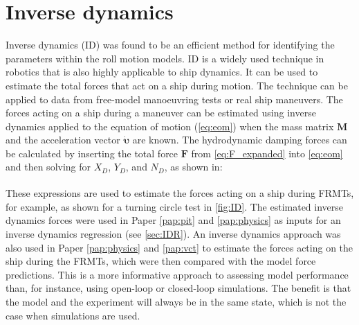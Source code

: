 \section{Inverse dynamics} \label{sec:ID}
Inverse dynamics (ID) was found to be an efficient method for identifying the parameters within the roll motion models. ID is a widely used technique in robotics \cite{faberInverseDynamicsMechanical2018, haningerNonparametricInverseDynamic2019, mastalliInverseDynamicsMPCNullspace2023, sunHighorderInverseDynamics2023, kurtzInverseDynamicsTrajectory2023} that is also highly applicable to ship dynamics. It can be used to estimate the total forces that act on a ship during motion. The technique can be applied to data from free-model manoeuvring tests or real ship maneuvers. The forces acting on a ship during a maneuver can be estimated using inverse dynamics applied to the equation of motion (\autoref{eq:eom}) when the mass matrix $\mathbf{M}$ and the acceleration vector $\pmb{\dot{\upsilon}}$ are known. The hydrodynamic damping forces can be calculated by inserting the total force $\mathbf{F}$ from \autoref{eq:F_expanded} into \autoref{eq:eom} and then solving for $X_D$, $Y_D$, and $N_D$, as shown in:
\begin{equation}
\label{eq:ID}
\begin{aligned}
    &  & \\
    &  & \\
    &  & 
\end{aligned}
\end{equation}
These expressions are used to estimate the forces acting on a ship during FRMTs, for example, as shown for a turning circle test in \autoref{fig:ID}.
The estimated inverse dynamics forces were used in Paper \ref{pap:pit} and \ref{pap:physics} as inputs for an inverse dynamics regression (see \autoref{sec:IDR}). 
An inverse dynamics approach was also used in Paper \ref{pap:physics} and \ref{pap:vct} to estimate the forces acting on the ship during the FRMTs, which were then compared with the model force predictions. This is a more informative approach to assessing model performance than, for instance, using open-loop or closed-loop simulations. The benefit is that the model and the experiment will always be in the same state, which is not the case when simulations are used.
